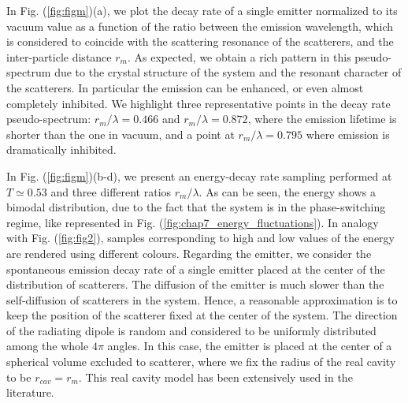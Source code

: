 In Fig. (\ref{fig:figm})(a), we plot the decay rate of a single emitter normalized to its vacuum value as a function of the ratio between the emission wavelength, which is considered to coincide with the scattering resonance of the scatterers, and the inter-particle distance $r_{m}$. As expected, we obtain a rich pattern in this pseudo-spectrum due to the crystal structure of the system and the resonant character of the scatterers. In particular the emission can be enhanced, or even almost completely inhibited. We highlight three representative points in the decay rate pseudo-spectrum: $r_{m}/\lambda=0.466$ and $r_{m}/\lambda=0.872$, where the emission lifetime is shorter than the one in vacuum, and a point at $r_{m}/\lambda=0.795$ where emission is dramatically inhibited. 


 
In Fig. (\ref{fig:figm})(b-d), we present an energy-decay rate sampling performed at $T\simeq0.53$ and three different ratios $r_{m}/\lambda$. As can be seen, the energy shows a bimodal distribution, due to the fact that the system is in the phase-switching regime, like represented in Fig. (\ref{fig:chap7_energy_fluctuations}). In analogy with Fig. (\ref{fig:fig2}), samples corresponding to high and low values of the energy are rendered using different colours. Regarding the emitter, we consider the spontaneous emission decay rate of a single emitter placed at the center of the distribution of scatterers. The diffusion of the emitter is much slower than the self-diffusion of scatterers in the system. Hence, a reasonable approximation is to keep the position of the scatterer fixed at the center of the system. The direction of the radiating dipole is random and considered to be uniformly distributed among the whole $4\pi$ angles. In this case, the emitter is placed at the center of a spherical volume excluded to scatterer, where we fix the radius of the real cavity to be $r_{cav}=r_{m}$. This real cavity model \cite{Froufe_PRA_2007,Sapienza_2011} has been extensively used in the literature. 

